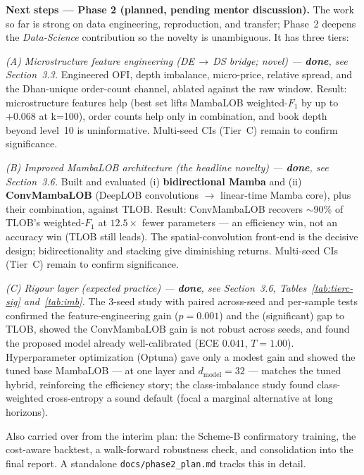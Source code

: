 \documentclass[11pt]{article}
\begin{document}
\medskip\noindent\textbf{Next steps --- Phase 2 (planned, pending mentor discussion).} The work so far is
strong on data engineering, reproduction, and transfer; Phase~2 deepens the \emph{Data-Science} contribution
so the novelty is unambiguous. It has three tiers:

\noindent\emph{(A) Microstructure feature engineering (DE\,$\rightarrow$\,DS bridge; novel) --- \textbf{done},
see Section~3.3.} Engineered OFI, depth imbalance, micro-price, relative spread, and the Dhan-unique
order-count channel, ablated against the raw window. Result: microstructure features help (best set lifts
MambaLOB weighted-$F_1$ by up to $+0.068$ at k=100), order counts help only in combination, and book depth
beyond level~10 is uninformative. Multi-seed CIs (Tier~C) remain to confirm significance.

\noindent\emph{(B) Improved MambaLOB architecture (the headline novelty) --- \textbf{done}, see Section~3.6.}
Built and evaluated (i) \textbf{bidirectional Mamba} and (ii) \textbf{ConvMambaLOB} (DeepLOB convolutions
$\rightarrow$ linear-time Mamba core), plus their combination, against TLOB. Result: ConvMambaLOB recovers
$\sim$90\% of TLOB's weighted-$F_1$ at $12.5\times$ fewer parameters --- an efficiency win, not an accuracy
win (TLOB still leads). The spatial-convolution front-end is the decisive design; bidirectionality and
stacking give diminishing returns. Multi-seed CIs (Tier~C) remain to confirm significance.

\noindent\emph{(C) Rigour layer (expected practice) --- \textbf{done}, see Section~3.6,
Tables~\ref{tab:tierc-sig} and~\ref{tab:imb}.} The 3-seed study with paired across-seed and per-sample tests
confirmed the feature-engineering gain ($p{=}0.001$) and the (significant) gap to TLOB, showed the
ConvMambaLOB gain is not robust across seeds, and found the proposed model already well-calibrated
(ECE $0.041$, $T{=}1.00$). Hyperparameter optimization (Optuna) gave only a modest gain and showed the tuned
base MambaLOB --- at one layer and $d_{\mathrm{model}}{=}32$ --- matches the tuned hybrid, reinforcing the
efficiency story; the class-imbalance study found class-weighted cross-entropy a sound default (focal a
marginal alternative at long horizons).

\noindent Also carried over from the interim plan: the Scheme-B confirmatory training, the cost-aware
backtest, a walk-forward robustness check, and consolidation into the final report. A standalone
\texttt{docs/phase2\_plan.md} tracks this in detail.
\end{document}
